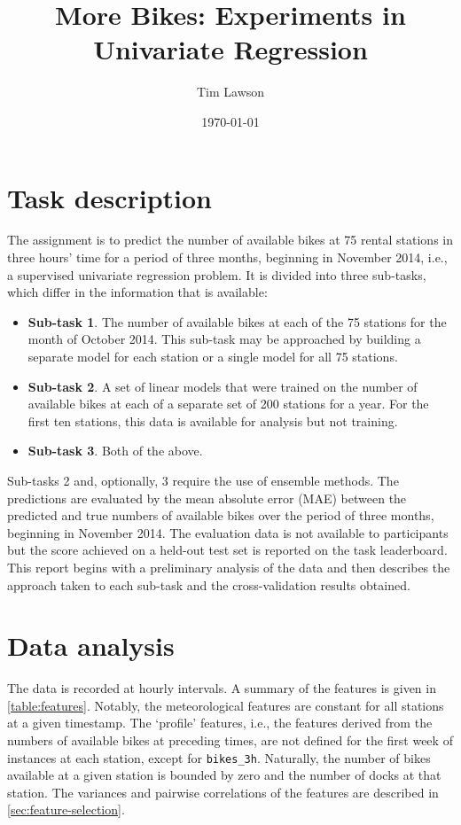 \documentclass[11pt]{extarticle}
\begin{document}
\title{More Bikes: Experiments in Univariate Regression}
\author{Tim Lawson}
\date{\today}

\maketitle

\section{Task description}

The assignment is to predict the number of available bikes at 75 rental stations in
three hours' time for a period of three months, beginning in November 2014, i.e., a
supervised univariate regression problem.
It is divided into three sub-tasks, which differ in the information that is available:
\begin{itemize}
  \item \textbf{Sub-task 1}.
        The number of available bikes at each of the 75 stations for the month of October 2014.
        This sub-task may be approached by building a separate model for each station or a
        single model for all 75 stations.
  \item \textbf{Sub-task 2}.
        A set of linear models that were trained on the number of available bikes at each of a
        separate set of 200 stations for a year.
        For the first ten stations, this data is available for analysis but not training.
  \item \textbf{Sub-task 3}.
        Both of the above.
\end{itemize}
Sub-tasks 2 and, optionally, 3 require the use of ensemble methods.
The predictions are evaluated by the mean absolute error (MAE) between the predicted
and true numbers of available bikes over the period of three months, beginning in
November 2014.
The evaluation data is not available to participants but the score achieved on a
held-out test set is reported on the task leaderboard.
This report begins with a preliminary analysis of the data and then describes the
approach taken to each sub-task and the cross-validation results obtained.

\section{Data analysis}
\label{sec:data-analysis}

The data is recorded at hourly intervals.
A summary of the features is given in \cref{table:features}.
Notably, the meteorological features are constant for all stations at a given timestamp.
The `profile' features, i.e., the features derived from the numbers of available bikes
at preceding times, are not defined for the first week of instances at each station,
except for \texttt{bikes\_3h}.
Naturally, the number of bikes available at a given station is bounded by zero and the
number of docks at that station.
The variances and pairwise correlations of the features are described in \cref{sec:feature-selection}.
\end{document}
